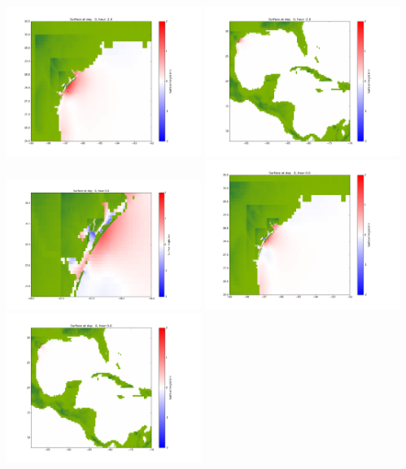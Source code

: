 \documentclass[11pt]{article}
\begin{document}
\includegraphics[width=0.475\textwidth]{frame0023fig1002.png}
\vskip 10pt 
\includegraphics[width=0.475\textwidth]{frame0023fig1003.png}
\vskip 10pt 
\includegraphics[width=0.475\textwidth]{frame0024fig1001.png}
\includegraphics[width=0.475\textwidth]{frame0024fig1002.png}
\vskip 10pt 
\includegraphics[width=0.475\textwidth]{frame0024fig1003.png}
\end{document}
